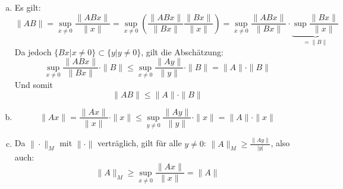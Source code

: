 \documentclass[a4paper]{scrartcl}
\begin{document}
\begin{aufgabe}
\begin{enumerate}[(a)]
\item
Es gilt:
\[
\|AB\|
=\sup_{x\neq 0}\frac{\|ABx\|}{\|x\|}
=\sup_{x\neq 0}\left(\frac{\|ABx\|}{\|Bx\|}\frac{\|Bx\|}{\|x\|}\right)
=\sup_{x\neq 0}\frac{\|ABx\|}{\|Bx\|}\cdot\underbrace{\sup\frac{\|Bx\|}{\|x\|}}_{=\|B\|}
\]
Da jedoch $\{Bx|x\neq 0\}\subset\{y|y\neq 0\}$, gilt die Abschätzung:
\[
\sup_{x\neq 0}\frac{\|ABx\|}{\|Bx\|}\cdot\|B\|
\le \sup_{x\neq 0}\frac{\|Ay\|}{\|y\|}\cdot\|B\|
= \|A\|\cdot\|B\|
\]
Und somit
\[
\|AB\|\le \|A\|\cdot\|B\|
\]
\item
\[
\|Ax\| 
= \frac{\|Ax\|}{\|x\|}\cdot \|x\|
\le \sup_{y\neq 0}\frac{\|Ay\|}{\|y\|}\cdot \|x\|
= \|A\|\cdot\|x\|
\]
\item
	Da $\|\cdot\|_M$ mit $\|\cdot\|$ verträglich, gilt für alle $y\neq 0$: $\|A\|_M\ge \frac {\|Ay\|}{|y|}$, also auch:
\[
\|A\|_M
\ge \sup_{x\neq 0}\frac{\|Ax\|}{\|x\|}
= \|A\|
\]
\end{enumerate}

\end{aufgabe}
\end{document}
